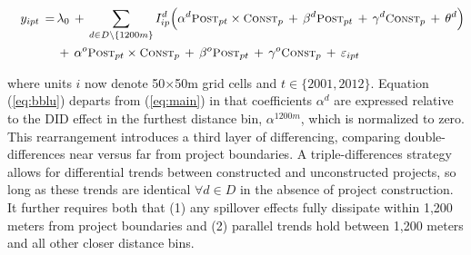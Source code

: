 \documentclass[12pt]{article}
\begin{document}
\vspace{-4mm}

\begin{equation} \label{eq:bblu}
\begin{aligned}
\quad y_{ipt} \, =& \, \lambda_{0} \,+\, \sum\limits_{d\in D\setminus\{1200m\}} I^d_{ip}\Big( \alpha^d \textsc{\small Post}_{pt}\times\textsc{\small Const}_{p} \, + \, \beta^d\textsc{\small Post}_{pt} \, + \, \gamma^d\textsc{\small Const}_{p} \, + \, \theta^{d} \Big) \\
& \, + \, \alpha^o \textsc{\small Post}_{pt}\times\textsc{\small Const}_{p} \, + \, \beta^o\textsc{\small Post}_{pt} \, + \, \gamma^o\textsc{\small Const}_{p} \, + \, \varepsilon_{ipt} \quad 
\end{aligned}
\end{equation}

\noindent where units $i$ now denote 50$\times$50m grid cells and $t\in\{2001,2012\}$. Equation (\ref{eq:bblu}) departs from (\ref{eq:main}) in that coefficients $\alpha^d$ are expressed relative to the DID effect in the furthest distance bin, $\alpha^{1200m}$, which is normalized to zero. This rearrangement introduces  a third layer of differencing, comparing double-differences near versus far from project boundaries. A triple-differences strategy allows for differential trends between constructed and unconstructed projects, so long as these trends are identical $\forall d\in D$ in the absence of project construction. It further requires both that (1) any spillover effects fully dissipate within 1,200 meters from project boundaries and (2) parallel trends hold between 1,200 meters and all other closer distance bins.

\end{document}
